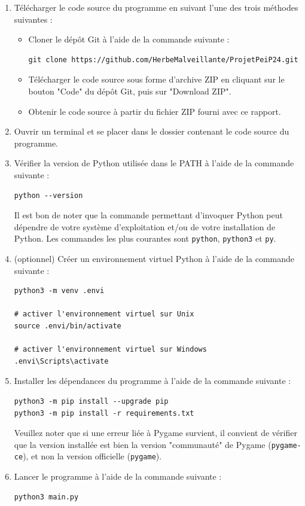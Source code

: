 \documentclass[12pt]{scrreprt} %
\begin{document}
\begin{enumerate}
    \item Télécharger le code source du programme en suivant l'une des trois méthodes suivantes :
          \begin{itemize}
              \item Cloner le dépôt Git à l'aide de la commande suivante :
                    \begin{verbatim}
git clone https://github.com/HerbeMalveillante/ProjetPeiP24.git      
              \end{verbatim}
              \item Télécharger le code source sous forme d'archive ZIP en cliquant sur le bouton "Code" du dépôt Git, puis sur "Download ZIP".
              \item Obtenir le code source à partir du fichier ZIP fourni avec ce rapport.
          \end{itemize}
    \item Ouvrir un terminal et se placer dans le dossier contenant le code source du programme.
    \item Vérifier la version de Python utilisée dans le PATH à l'aide de la commande suivante :
          \begin{verbatim}
python --version
    \end{verbatim}
          Il est bon de noter que la commande permettant d'invoquer Python peut dépendre de votre système d'exploitation et/ou de votre installation de Python. Les commandes les plus courantes sont \texttt{python}, \texttt{python3} et \texttt{py}.
    \item (optionnel) Créer un environnement virtuel Python à l'aide de la commande suivante :
          \begin{verbatim}
python3 -m venv .envi

# activer l'environnement virtuel sur Unix
source .envi/bin/activate

# activer l'environnement virtuel sur Windows
.envi\Scripts\activate
    \end{verbatim}
    \item Installer les dépendances du programme à l'aide de la commande suivante :
          \begin{verbatim}
python3 -m pip install --upgrade pip
python3 -m pip install -r requirements.txt
    \end{verbatim}
          Veuillez noter que si une erreur liée à Pygame survient, il convient de vérifier que la version installée est bien la version "communauté" de Pygame (\texttt{pygame-ce}), et non la version officielle (\texttt{pygame}).

    \item Lancer le programme à l'aide de la commande suivante :
          \begin{verbatim}
python3 main.py
    \end{verbatim}

\end{enumerate}
\end{document}
